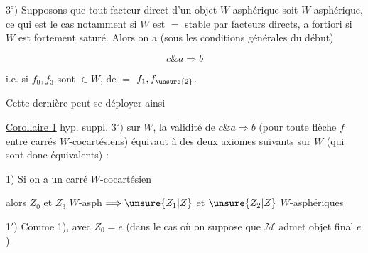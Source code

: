 
$3^\circ)$ Supposons que tout facteur direct d'un objet $W$-asphérique soit $W$-asphérique, ce qui est le cas notamment si $W$ est  $=$ stable par facteurs directs, a fortiori si $W$ est fortement saturé.  Alors on a (sous les conditions générales du début)

\[
c\mathbin{\&}a\Longrightarrow b
\]

i.e. si $f_0,f_3$ sont $\in W$, de $=$ $f_1,f_{\unsure{2}}$.

Cette dernière  peut se déployer ainsi

\uline{Corollaire 1}  hyp. suppl. $3^\circ)$ sur $W$, la validité de $c\mathbin{\&}a\Longrightarrow b$ (pour toute flèche $f$ entre carrés $W$-cocartésiens) équivaut à  des deux  axiomes suivants sur $W$ (qui sont donc équivalents) :

1) Si on a un carré  $W$-cocartésien


alors $Z_0$ et $Z_3$ $W$-asph $\Longrightarrow\unsure{Z_1|Z}$ et $\unsure{Z_2|Z}$ $W$-asphériques

1$'$) Comme 1), avec $Z_0=e$ (dans le cas où on suppose que $\mathcal M$ admet objet final $e$).
